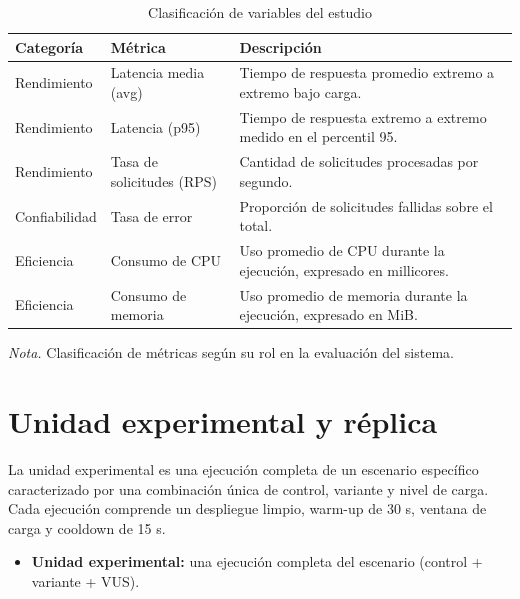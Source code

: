 \begin{table}[htbp]
\centering
\caption{Clasificación de variables del estudio}
\label{tab:variables}
\renewcommand{\arraystretch}{1.3}

\begin{tabular}{p{3cm} p{4cm} p{7cm}}
\hline
\textbf{Categoría} & \textbf{Métrica} & \textbf{Descripción} \\
\hline

Rendimiento & Latencia media (avg) & Tiempo de respuesta promedio extremo a extremo bajo carga. \\

Rendimiento & Latencia (p95) & Tiempo de respuesta extremo a extremo medido en el percentil 95. \\

Rendimiento & Tasa de solicitudes (RPS)	 & Cantidad de solicitudes procesadas por segundo. \\

Confiabilidad & Tasa de error & Proporción de solicitudes fallidas sobre el total. \\

Eficiencia & Consumo de CPU & Uso promedio de CPU durante la ejecución, expresado en millicores. \\

Eficiencia & Consumo de memoria & Uso promedio de memoria durante la ejecución, expresado en MiB. \\


\hline
\end{tabular}

\vspace{0.2cm}
{\raggedright \small \textit{Nota.} Clasificación de métricas según su rol en la evaluación del sistema.\par}

\end{table}

\section{Unidad experimental y réplica}

La unidad experimental es una ejecución completa de un escenario específico caracterizado por una combinación única de control, variante y nivel de carga. Cada ejecución comprende un despliegue limpio, warm-up de 30 s, ventana de carga y cooldown de 15 s.

\begin{itemize}
\item \textbf{Unidad experimental:} una ejecución completa del escenario (control + variante + VUS).
\end{itemize}

